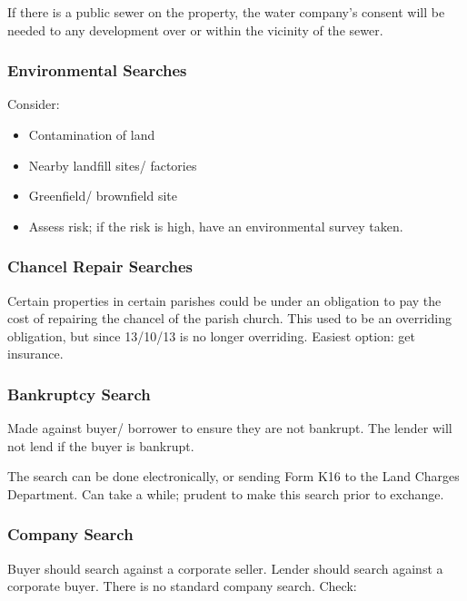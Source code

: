 \documentclass[
]{article}
\providecommand{\tightlist}{%
  \setlength{\itemsep}{0pt}\setlength{\parskip}{0pt}}
\begin{document}
If there is a public sewer on the property, the water company's consent
will be needed to any development over or within the vicinity of the
sewer.

\hypertarget{environmental-searches}{%
\subsubsection{Environmental Searches}\label{environmental-searches}}

Consider:

\begin{itemize}
\tightlist
\item
  Contamination of land
\item
  Nearby landfill sites/ factories
\item
  Greenfield/ brownfield site
\item
  Assess risk; if the risk is high, have an environmental survey taken.
\end{itemize}

\hypertarget{chancel-repair-searches}{%
\subsubsection{Chancel Repair Searches}\label{chancel-repair-searches}}

Certain properties in certain parishes could be under an obligation to
pay the cost of repairing the chancel of the parish church. This used to
be an overriding obligation, but since 13/10/13 is no longer overriding.
Easiest option: get insurance.

\hypertarget{bankruptcy-search}{%
\subsubsection{Bankruptcy Search}\label{bankruptcy-search}}

Made against buyer/ borrower to ensure they are not bankrupt. The lender
will not lend if the buyer is bankrupt.

The search can be done electronically, or sending Form K16 to the Land
Charges Department. Can take a while; prudent to make this search prior
to exchange.

\hypertarget{company-search}{%
\subsubsection{Company Search}\label{company-search}}

Buyer should search against a corporate seller. Lender should search
against a corporate buyer. There is no standard company search. Check:
\end{document}
